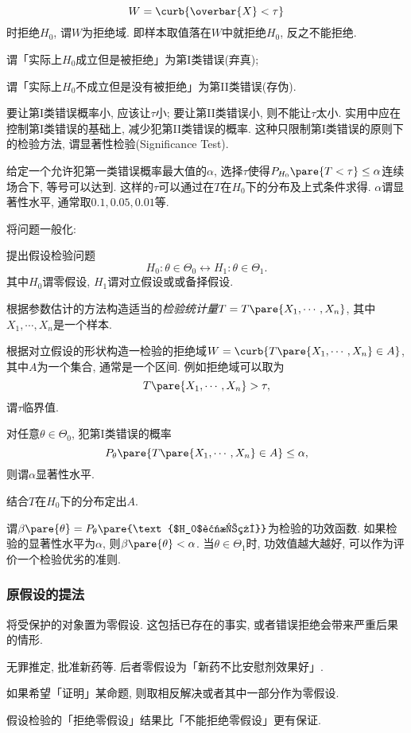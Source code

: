 \documentclass[../Statistics.tex]{subfiles}
\begin{document}
\[ W = \curb{\overbar{X} < \tau} \]
时拒绝$H_0$, 谓$W$为拒绝域. 即样本取值落在$W$中就拒绝$H_0$, 反之不能拒绝.
\par
\begin{cenum}
    \item 谓「实际上$H_0$成立但是被拒绝」为第I类错误(弃真);
    \item 谓「实际上$H_0$不成立但是没有被拒绝」为第II类错误(存伪).
\end{cenum}
要让第I类错误概率小, 应该让$\tau$小; 要让第II类错误小, 则不能让$\tau$太小. 实用中应在控制第I类错误的基础上, 减少犯第II类错误的概率. 这种只限制第I类错误的原则下的检验方法, 谓显著性检验(Significance Test).
\par
给定一个允许犯第一类错误概率最大值的$\alpha$, 选择$\tau$使得$P_{H_0}\pare{T<\tau}\le \alpha$连续场合下, 等号可以达到. 这样的$\tau$可以通过在$T$在$H_0$下的分布及上式条件求得. $\alpha$谓显著性水平, 通常取$0.1,0.05,0.01$等.
\par
将问题一般化:
\begin{cenum}
    \item 提出假设检验问题
    \[ H_0:\theta \in \Theta_0 \leftrightarrow H_1: \theta\in\Theta_1. \]
    其中$H_0$谓零假设, $H_1$谓对立假设或或备择假设.
    \item 根据参数估计的方法构造适当的\emph{检验统计量}$T = T\pare{X_1,\cdots,X_n}$, 其中$X_1,\cdots,X_n$是一个样本.
    \item 根据对立假设的形状构造一检验的拒绝域$W = \curb{T\pare{X_1,\cdots,X_n}\in A}$, 其中$A$为一个集合, 通常是一个区间. 例如拒绝域可以取为
    \[ T\pare{X_1,\cdots,X_n}>\tau, \]
    谓$\tau$临界值.
    \item 对任意$\theta\in\Theta_0$, 犯第I类错误的概率
    \[ P_\theta\pare{T\pare{X_1,\cdots,X_n}\in A} \le \alpha, \]
    则谓$\alpha$显著性水平.
    \item 结合$T$在$H_0$下的分布定出$A$.
\end{cenum}
谓$\beta\pare{\theta} = P_\theta\pare{\text{$H_0$被拒绝}}$为检验的功效函数. 如果检验的显著性水平为$\alpha$, 则$\beta\pare{\theta}<\alpha$. 当$\theta\in\Theta_1$时, 功效值越大越好, 可以作为评价一个检验优劣的准则.


\subsubsection{原假设的提法} %
\label{ssub:原假设的提法}

将受保护的对象置为零假设. 这包括已存在的事实, 或者错误拒绝会带来严重后果的情形.
\begin{ex}
    无罪推定, 批准新药等. 后者零假设为「新药不比安慰剂效果好」.
\end{ex}
\par
如果希望「证明」某命题, 则取相反解决或者其中一部分作为零假设.
\par
假设检验的「拒绝零假设」结果比「不能拒绝零假设」更有保证.
\end{document}

